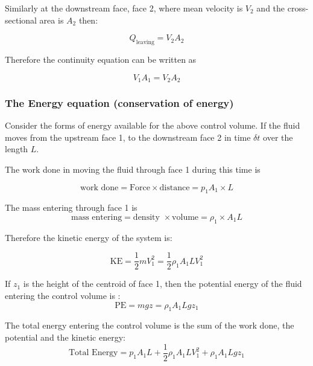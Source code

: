 \documentclass[a4paper, 12pt, british]{article} %
\numberwithin{equation}{section}
\numberwithin{figure}{section}
\numberwithin{table}{section}
\begin{document}
Similarly at the downstream face, face 2, where mean velocity is $V_2$ and the cross-sectional area is $A_2$ then:
 
 \begin{equation}
 Q_\text{leaving} = V_2 A_2
 \end{equation}

Therefore the continuity equation can be written as

  \begin{equation}
V_1 A_1 = V_2 A_2
 \end{equation}


\subsubsection{The Energy equation (conservation of energy)}

Consider the forms of energy available for the above control volume. If the fluid moves from the upstream face 1, to the downstream face 2 in time $\delta t$ over the length $L$.

The work done in moving the fluid through face 1 during this time is 

   \begin{equation}
 \text{work done} = \text{Force} \times \text{distance} = p_1 A_1  \times L
 \end{equation}

The mass entering through face 1 is 
    \begin{equation}
 \text{mass entering} =  \text{density } \times \text{volume} = \rho_1 \times A_1 L
 \end{equation}

Therefore the kinetic energy of the system is:

    \begin{equation}
 \text{KE} = \frac{1}{2} m V^2_1 = \frac{1}{2} \rho_1 A_1 L V_1^2
 \end{equation}

If $z_1$ is the height of the centroid of face 1, then the potential energy of the fluid entering the control volume is :
    \begin{equation}
	\text{PE} = mgz = \rho_1 A_1 L g z_1
\end{equation}
 

The total energy entering the control volume is the sum of the work done, the potential and the kinetic energy:
    \begin{equation}
	\text{Total Energy} = p_1 A_1 L + \frac{1}{2} \rho_1 A_1 L V_1^2 + \rho_1 A_1 L g z_1 
	\end{equation}
\end{document}
